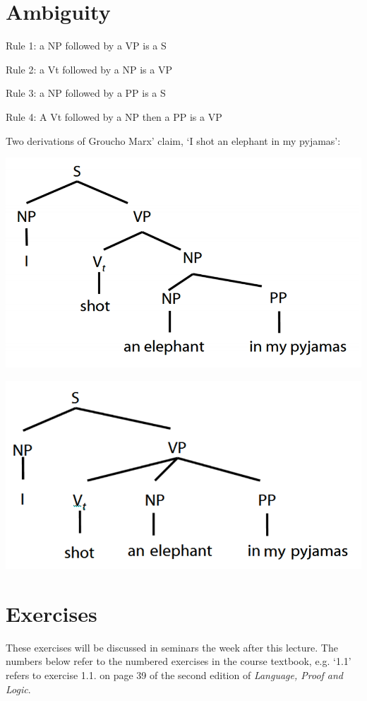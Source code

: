 \documentclass[12pt]{extarticle}
\begin{document}
\begin{multicols*}{3}
 
\section{Ambiguity}
 
Rule 1: a NP followed by a VP is a S
 
Rule 2: a Vt followed by a NP is a VP
 
Rule 3: a NP followed by a PP is a S
 
Rule 4: A Vt followed by a NP then a PP is a VP
 
Two derivations of Groucho Marx’ claim, ‘I shot an elephant in my pyjamas':
 
\begin{center}
\includegraphics[scale=0.3]{img/groucho1.png}
\end{center}
\begin{center}
\includegraphics[scale=0.3]{img/groucho2.png}
\end{center}
\vfill
\begin{minipage}{\columnwidth}
\section{Exercises}
These exercises will be discussed in seminars the week after this lecture.
The numbers below refer to the numbered exercises in the course textbook, e.g. `1.1' refers to exercise 1.1. on page 39 of the second edition of \emph{Language, Proof and Logic}.
 

\end{minipage}
\end{multicols*}
\end{document}
